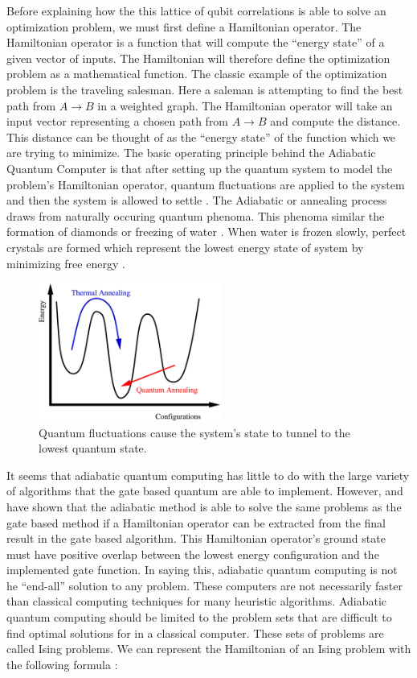 \documentclass[conference]{IEEEtran}
\begin{document}
Before explaining how the this lattice of qubit correlations is able to solve an optimization problem, we must first define a Hamiltonian operator. The Hamiltonian operator is a function that will compute the ``energy state'' of a given vector of inputs. The Hamiltonian will therefore define the optimization problem as a mathematical function. The classic example of the optimization problem is the traveling salesman. Here a saleman is attempting to find the best path from $A \rightarrow B$ in a weighted graph. The Hamiltonian operator will take an input vector representing a chosen path from $A \rightarrow B$ and compute the distance. This distance can be thought of as the ``energy state'' of the function which we are trying to minimize. The basic operating principle behind the Adiabatic Quantum Computer is that after setting up the quantum system to model the problem's Hamiltonian operator, quantum fluctuations are applied to the system and then the system is allowed to settle \cite{b10}. The Adiabatic or annealing process draws from naturally occuring quantum phenoma. This phenoma similar the formation of diamonds or freezing of water \cite{b1}. When water is frozen slowly, perfect crystals are formed which represent the lowest energy state of system by minimizing free energy \cite{b1}.

\begin{figure}[htbp]
\centerline{\includegraphics[width=6cm]{annealing}}
\caption{Quantum fluctuations cause the system's state to tunnel to the lowest quantum state.}
\label{teleportion}
\end{figure}

It seems that adiabatic quantum computing has little to do with the large variety of algorithms that the gate based quantum are able to implement. However, \cite{b12} and \cite{b10} have shown that the adiabatic method is able to solve the same problems as the gate based method if a Hamiltonian operator can be extracted from the final result in the gate based algorithm. This Hamiltonian operator's ground state must have positive overlap between the lowest energy configuration and the implemented gate function. In saying this, adiabatic quantum computing is not he ``end-all'' solution to any problem. These computers are not necessarily faster than classical computing techniques for many heuristic algorithms. Adiabatic quantum computing should be limited to the problem sets that are difficult to find optimal solutions for in a classical computer. These sets of problems are called Ising problems. We can represent the Hamiltonian of an Ising problem with the following formula \cite{b13}:
\end{document}
